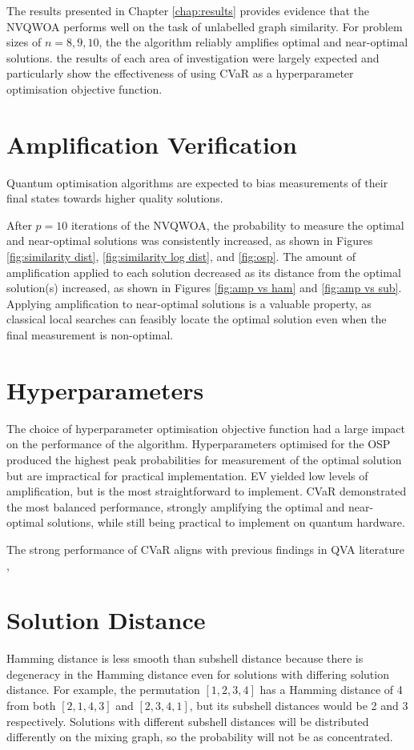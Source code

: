 The results presented in Chapter \ref{chap:results} provides evidence that the NVQWOA performs well on the task of unlabelled graph similarity. For problem sizes of $n=8,9,10$, the the algorithm reliably amplifies optimal and near-optimal solutions. the results of each area of investigation were largely expected and particularly show the effectiveness of using CVaR as a hyperparameter optimisation objective function.

\section{Amplification Verification}
Quantum optimisation algorithms are expected to bias measurements of their final states towards higher quality solutions.

After $p=10$ iterations of the NVQWOA, the probability to measure the optimal and near-optimal solutions was consistently increased, as shown in Figures \ref{fig:similarity dist}, \ref{fig:similarity log dist}, and \ref{fig:osp}. The amount of amplification applied to each solution decreased as its distance from the optimal solution(s) increased, as shown in Figures \ref{fig:amp vs ham} and \ref{fig:amp vs sub}. Applying amplification to near-optimal solutions is a valuable property, as classical local searches can feasibly locate the optimal solution even when the final measurement is non-optimal.

\section{Hyperparameters}
The choice of hyperparameter optimisation objective function had a large impact on the performance of the algorithm. Hyperparameters optimised for the OSP produced the highest peak probabilities for measurement of the optimal solution but are impractical for practical implementation. EV yielded low levels of amplification, but is the most straightforward to implement. CVaR demonstrated the most balanced performance, strongly amplifying the optimal and near-optimal solutions, while still being practical to implement on quantum hardware.

The strong performance of CVaR aligns with previous findings in QVA literature \cite{cvar_opt,CVaR_quantum}, 

\section{Solution Distance}
Hamming distance is less smooth than subshell distance because there is degeneracy in the Hamming distance even for solutions with differing solution distance. For example, the permutation $[1,2,3,4]$ has a Hamming distance of 4 from both $[2,1,4,3]$ and $[2,3,4,1]$, but its subshell distances would be 2 and 3 respectively. Solutions with different subshell distances will be distributed differently on the mixing graph, so the probability will not be as concentrated.

